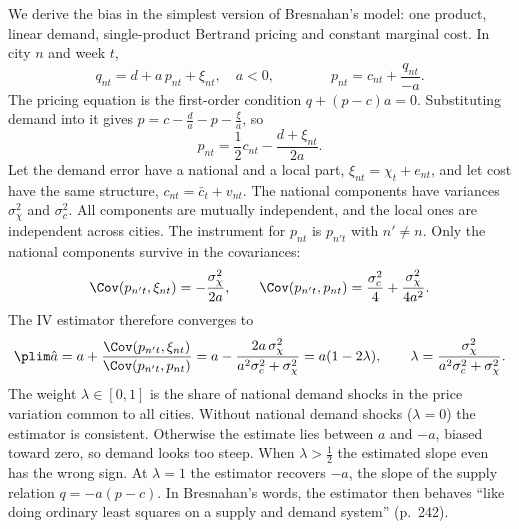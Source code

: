 We derive the bias in the simplest version of Bresnahan's model: one product, linear demand, single-product
Bertrand pricing and constant marginal cost. In city $n$ and week $t$,
\begin{equation*}
  q_{nt} = d + a\,p_{nt} + \xi_{nt}, \quad a < 0, \qquad\qquad p_{nt} = c_{nt} + \frac{q_{nt}}{-a}.
\end{equation*}
The pricing equation is the first-order condition $q + (p - c)a = 0$. Substituting demand into it gives
$p = c - \frac{d}{a} - p - \frac{\xi}{a}$, so
\begin{equation*}
  p_{nt} = \frac{1}{2}c_{nt} - \frac{d + \xi_{nt}}{2a}.
\end{equation*}
Let the demand error have a national and a local part, $\xi_{nt} = \chi_t + e_{nt}$, and let cost have the same
structure, $c_{nt} = \bar c_t + v_{nt}$. The national components have variances $\sigma_\chi^2$ and $\sigma_c^2$.
All components are mutually independent, and the local ones are independent across cities. The instrument for
$p_{nt}$ is $p_{n't}$ with $n'\neq n$. Only the national components survive in the covariances:
\begin{equation*}
  \Cov(p_{n't},\xi_{nt}) = -\frac{\sigma_\chi^2}{2a}, \qquad
  \Cov(p_{n't},p_{nt}) = \frac{\sigma_c^2}{4} + \frac{\sigma_\chi^2}{4a^2}.
\end{equation*}
The IV estimator therefore converges to
\begin{equation}\label{eq:05-iv-bias-scalar}
  \plim\hat a = a + \frac{\Cov(p_{n't},\xi_{nt})}{\Cov(p_{n't},p_{nt})}
  = a - \frac{2a\,\sigma_\chi^2}{a^2\sigma_c^2 + \sigma_\chi^2} = a(1 - 2\lambda),
  \qquad \lambda = \frac{\sigma_\chi^2}{a^2\sigma_c^2 + \sigma_\chi^2}.
\end{equation}
The weight $\lambda\in[0,1]$ is the share of national demand shocks in the price variation common to all
cities. Without national demand shocks ($\lambda = 0$) the estimator is consistent. Otherwise the estimate lies
between $a$ and $-a$, biased toward zero, so demand looks too steep. When $\lambda > \frac{1}{2}$ the estimated
slope even has the wrong sign. At $\lambda = 1$ the estimator recovers $-a$, the slope of the supply relation
$q = -a(p - c)$. In Bresnahan's words, the estimator then behaves ``like doing ordinary least squares on a supply
and demand system'' (p.~242).


